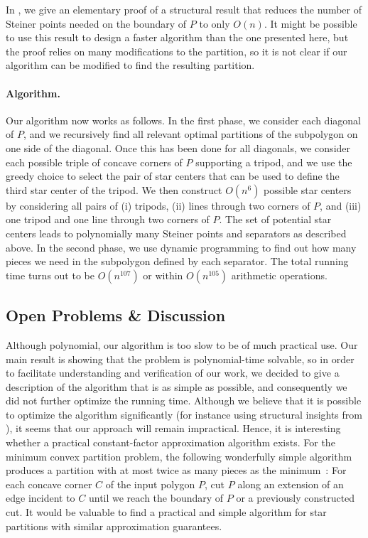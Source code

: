 \documentclass{theoretics}
\begin{document}
In , we give an elementary proof of a structural result that reduces the number of Steiner points needed on the boundary of $P$ to only $O(n)$.
It might be possible to use this result to design a faster algorithm than the one presented here, but the proof relies on many modifications to the partition, so it is not clear if our algorithm can be modified to find the resulting partition.

\paragraph{Algorithm.}
Our algorithm now works as follows.
In the first phase, we consider each diagonal of $P$, and we recursively find all relevant optimal partitions of the subpolygon on one side of the diagonal.
Once this has been done for all diagonals, we consider each possible triple of concave corners of $P$ supporting a tripod, and we use the greedy choice to select the pair of star centers that can be used to define the third star center of the tripod.
We then construct $O(n^6)$ possible star centers by considering all pairs of (i) tripods, (ii) lines through two corners of $P$, and (iii) one tripod and one line through two corners of $P$.
The set of potential star centers leads to polynomially many Steiner points and separators as described above.
In the second phase, we use dynamic programming to find out how many pieces we need in the subpolygon defined by each separator. The total running time turns out to be $O(n^{107})$ or within $O(n^{105})$ arithmetic operations.

\subsection{Open Problems \& Discussion}

Although polynomial, our algorithm is too slow to be of much practical use.
Our main result is showing that the problem is polynomial-time solvable, so
in order to facilitate understanding and verification of our work, we decided to give a description of the algorithm that is as simple as possible, and consequently we did not further optimize the running time.
Although we believe that it is possible to optimize the algorithm significantly (for instance using structural insights from ), it seems that our approach will remain impractical.
Hence, it is interesting whether a practical constant-factor approximation algorithm exists.
For the minimum convex partition problem, the following wonderfully simple algorithm produces a partition with at most twice as many pieces as the minimum~\cite{chazelle1985approximation}:
For each concave corner $C$ of the input polygon $P$, cut $P$ along an extension of an edge incident to $C$ until we reach the boundary of $P$ or a previously constructed cut.
It would be valuable to find a practical and simple algorithm for star partitions with similar approximation guarantees.
\end{document}
